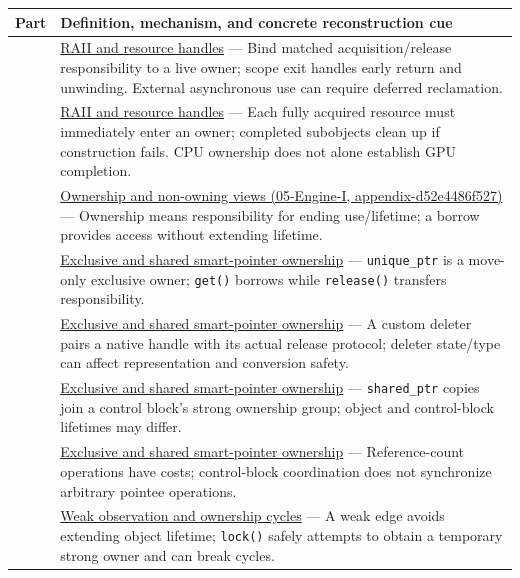 {\def\LTcaptype{none} %
\begin{longtable}[]{@{}
  >{\raggedright\arraybackslash}p{}
  >{\raggedright\arraybackslash}p{}@{}}
\toprule\noalign{}
\begin{minipage}[b]{\linewidth}\raggedright
Part
\end{minipage} & \begin{minipage}[b]{\linewidth}\raggedright
Definition, mechanism, and concrete reconstruction cue
\end{minipage} \\
\midrule\noalign{}
\endhead
\bottomrule\noalign{}
\endlastfoot
148 & \hyperref[appendix-69739d3ab49b]{RAII and resource handles} --- Bind matched acquisition/release responsibility to a live owner; scope exit handles early return and unwinding. External asynchronous use can require deferred reclamation. \\
149 & \hyperref[appendix-69739d3ab49b]{RAII and resource handles} --- Each fully acquired resource must immediately enter an owner; completed subobjects clean up if construction fails. CPU ownership does not alone establish GPU completion. \\
150 & \href{}{Ownership and non-owning views (05-Engine-I, appendix-d52e4486f527)} --- Ownership means responsibility for ending use/lifetime; a borrow provides access without extending lifetime. \\
151 & \hyperref[appendix-51602cabe815]{Exclusive and shared smart-pointer ownership} --- \texttt{unique\_ptr} is a move-only exclusive owner; \texttt{get()} borrows while \texttt{release()} transfers responsibility. \\
152 & \hyperref[appendix-51602cabe815]{Exclusive and shared smart-pointer ownership} --- A custom deleter pairs a native handle with its actual release protocol; deleter state/type can affect representation and conversion safety. \\
153 & \hyperref[appendix-51602cabe815]{Exclusive and shared smart-pointer ownership} --- \texttt{shared\_ptr} copies join a control block's strong ownership group; object and control-block lifetimes may differ. \\
154 & \hyperref[appendix-51602cabe815]{Exclusive and shared smart-pointer ownership} --- Reference-count operations have costs; control-block coordination does not synchronize arbitrary pointee operations. \\
155 & \hyperref[appendix-b9548675eb2b]{Weak observation and ownership cycles} --- A weak edge avoids extending object lifetime; \texttt{lock()} safely attempts to obtain a temporary strong owner and can break cycles. \\

\end{longtable}}
